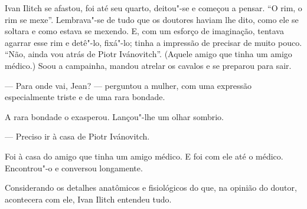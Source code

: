 Ivan Ilitch se afastou, foi até seu quarto, deitou"-se e começou a
pensar. ``O rim, o rim se mexe''. Lembrava"-se de tudo que os doutores
haviam lhe dito, como ele se soltara e como estava se mexendo. E, com um
esforço de imaginação, tentava agarrar esse rim e detê"-lo, fixá"-lo;
tinha a impressão de precisar de muito pouco. ``Não, ainda vou atrás de
Piotr Ivánovitch''. (Aquele amigo que tinha um amigo médico.) Soou a
campainha, mandou atrelar os cavalos e se preparou para sair.

--- Para onde vai, Jean? --- perguntou a mulher, com uma expressão
especialmente triste e de uma rara bondade.

A rara bondade o exasperou. Lançou"-lhe um olhar sombrio.

--- Preciso ir à casa de Piotr Ivánovitch.

Foi à casa do amigo que tinha um amigo médico. E foi com ele até o
médico. Encontrou"-o e conversou longamente.

Considerando os detalhes anatômicos e fisiológicos do que, na opinião do
doutor, acontecera com ele, Ivan Ilitch entendeu tudo.

